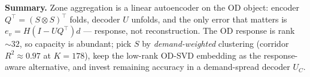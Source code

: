 \documentclass[11pt]{article}
\begin{document}
\begin{keybox}
\textbf{Summary.} Zone aggregation is a linear autoencoder on the OD object:
encoder $Q^{\!\top}=(S\otimes S)^{\!\top}$ folds, decoder $U$ unfolds, and the only
error that matters is $e_v=H(I-UQ^{\!\top})d$ --- response, not reconstruction. The
OD response is rank $\sim\!32$, so capacity is abundant; pick $S$ by
\emph{demand-weighted} clustering (corridor $R^2\approx0.97$ at $K{=}178$), keep the
low-rank OD-SVD embedding as the response-aware alternative, and invest remaining
accuracy in a demand-spread decoder $U_C$.
\end{keybox}
\end{document}
